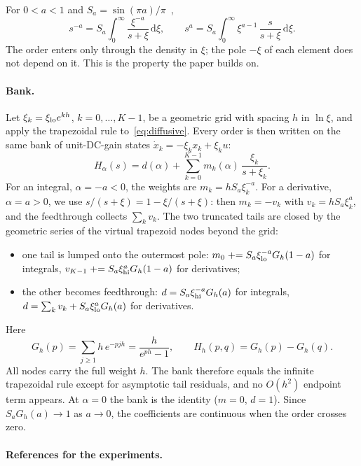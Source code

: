 For $0<a<1$ and $S_a=\sin(\pi a)/\pi$~\cite{montseny1998,diethelm2023},
\begin{equation}
s^{-a}=S_a\int_0^\infty \frac{\xi^{-a}}{s+\xi}\,\mathrm d\xi,\qquad s^{a}=S_a\int_0^\infty \xi^{a-1}\,\frac{s}{s+\xi}\,\mathrm d\xi.\label{eq:diffusive}
\end{equation}
The order enters only through the density in $\xi$; the pole $-\xi$ of each element does not depend on it. This is the property the paper builds on.

\paragraph{Bank.} Let $\xi_k=\xi_{\mathrm{lo}} e^{kh}$, $k=0,\dots,K-1$, be a geometric grid with spacing $h$ in $\ln\xi$, and apply the trapezoidal rule to~\eqref{eq:diffusive}. Every order is then written on the same bank of unit-DC-gain states $\dot x_k=-\xi_k x_k+\xi_k u$:
\begin{equation}
H_\alpha(s)=d(\alpha)+\sum_{k=0}^{K-1} m_k(\alpha)\,\frac{\xi_k}{s+\xi_k}.\label{eq:ctbank}
\end{equation}
For an integral, $\alpha=-a<0$, the weights are $m_k=hS_a\xi_k^{-a}$. For a derivative, $\alpha=a>0$, we use $s/(s+\xi)=1-\xi/(s+\xi)$: then $m_k=-v_k$ with $v_k=hS_a\xi_k^{a}$, and the feedthrough collects $\sum_k v_k$. The two truncated tails are closed by the geometric series of the virtual trapezoid nodes beyond the grid:
\begin{itemize}
\item one tail is lumped onto the outermost pole: $m_0\mathrel{+}=S_a\xi_{\mathrm{lo}}^{-a}G_h(1-a)$ for integrals, $v_{K-1}\mathrel{+}=S_a\xi_{\mathrm{hi}}^{a}G_h(1-a)$ for derivatives;
\item the other becomes feedthrough: $d=S_a\xi_{\mathrm{hi}}^{-a}G_h(a)$ for integrals, $d=\sum_k v_k+S_a\xi_{\mathrm{lo}}^{a}G_h(a)$ for derivatives.
\end{itemize}
Here
\begin{equation}
G_h(p)=\sum_{j\ge1}h\,e^{-pjh}=\frac{h}{e^{ph}-1},\qquad H_h(p,q)=G_h(p)-G_h(q).\label{eq:G}
\end{equation}
All nodes carry the full weight $h$. The bank therefore equals the infinite trapezoidal rule except for asymptotic tail residuals, and no $O(h^2)$ endpoint term appears. At $\alpha=0$ the bank is the identity ($m=0$, $d=1$). Since $S_aG_h(a)\to1$ as $a\to0$, the coefficients are continuous when the order crosses zero.

\paragraph{References for the experiments.}

